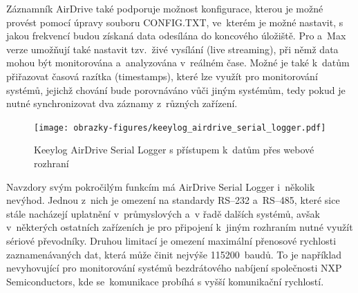 Záznamník AirDrive také podporuje možnost konfigurace, kterou je možné provést pomocí úpravy souboru CONFIG.TXT, ve~kterém je možné nastavit, s jakou frekvencí budou získaná data odesílána do koncového úložiště. Pro a~Max verze umožňují také nastavit tzv.~živé vysílání (live streaming), při němž data mohou být monitorována a~analyzována v~reálném čase. Možné je také k~datům přiřazovat časová razítka (timestamps), které lze využít pro monitorování systémů, jejichž chování bude porovnáváno vůči jiným systémům, tedy pokud je nutné synchronizovat dva záznamy z~různých zařízení.~\cite{keelog_airdrive_serial_datalogger}

\newpage

\begin{figure}[h]
    \centering
    \texttt{[image: obrazky-figures/keeylog\_airdrive\_serial\_logger.pdf]}
    
    \caption{Keeylog AirDrive Serial Logger s přístupem k~datům přes webové rozhraní~\cite{keelog_airdrive_serial_datalogger, keelog_airdrive_serial_datalogger_scheme}}
    \label{fig:keelog-airdrive-serial-datalogger}
\end{figure}

Navzdory svým pokročilým funkcím má AirDrive Serial Logger i~několik nevýhod. Jednou z~nich je omezení na standardy RS--232 a~RS--485, které sice stále nacházejí uplatnění v~průmyslových a~v řadě dalších systémů, avšak v~některých ostatních zařízeních je pro připojení k~jiným rozhraním nutné využít sériové převodníky. Druhou limitací je omezení maximální přenosové rychlosti zaznamenávaných dat, která může činit nejvýše 115200~baudů. To je například nevyhovující pro monitorování systémů bezdrátového nabíjení společnosti NXP Semiconductors, kde se~komunikace probíhá s vyšší komunikační rychlostí.~\cite{keelog_airdrive_serial_datalogger}

\newpage

